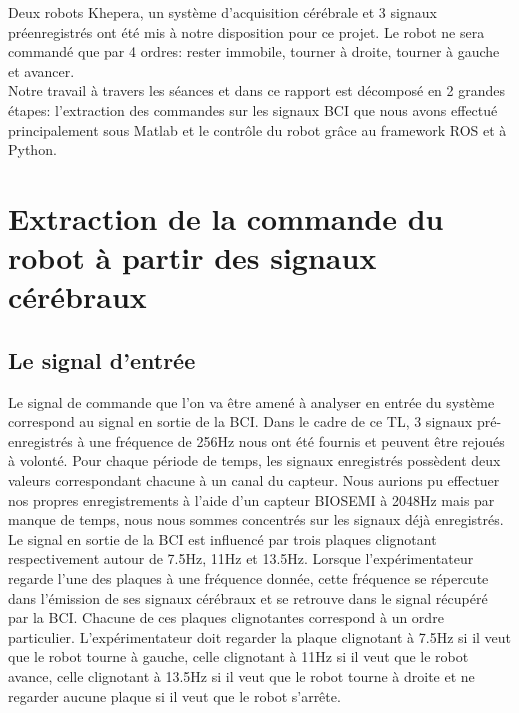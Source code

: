 \documentclass[11pt]{article}
\begin{document}
\noindent Deux robots Khepera, un système d'acquisition cérébrale et 3 signaux préenregistrés ont été mis à notre disposition pour ce projet. Le robot ne sera commandé que par 4 ordres: rester immobile, tourner à droite, tourner à gauche et avancer.\\

\noindent Notre travail à travers les séances et dans ce rapport est décomposé en 2 grandes étapes: l'extraction des commandes sur les signaux BCI que nous avons effectué principalement sous Matlab et le contrôle du robot grâce au framework ROS et à Python.


\cleardoublepage


\section{Extraction de la commande du robot à partir des signaux cérébraux}

\subsection{Le signal d'entrée}

Le signal de commande que l'on va être amené à analyser en entrée du système correspond au signal en sortie de la BCI. Dans le cadre de ce TL, 3 signaux pré-enregistrés à une fréquence de 256Hz nous ont été fournis et peuvent être rejoués à volonté. Pour chaque période de temps, les signaux enregistrés possèdent deux valeurs correspondant chacune à un canal du capteur. Nous aurions pu effectuer nos propres enregistrements à l'aide d'un capteur BIOSEMI à 2048Hz mais par manque de temps, nous nous sommes concentrés sur les signaux déjà enregistrés. \\

Le signal en sortie de la BCI est influencé par trois plaques clignotant respectivement autour de 7.5Hz, 11Hz et 13.5Hz. Lorsque l'expérimentateur regarde l'une des plaques à une fréquence donnée, cette fréquence se répercute dans l'émission de ses signaux cérébraux et se retrouve dans le signal récupéré par la BCI. Chacune de ces plaques clignotantes correspond à un ordre particulier. L'expérimentateur doit regarder la plaque clignotant à 7.5Hz si il veut que le robot tourne à gauche, celle clignotant à 11Hz si il veut que le robot avance, celle clignotant à 13.5Hz si il veut que le robot tourne à droite et ne regarder aucune plaque si il veut que le robot s'arrête.
\end{document}

